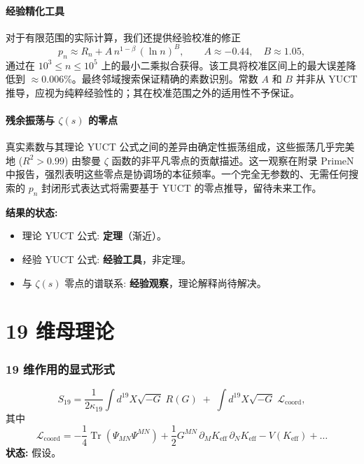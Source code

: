 \documentclass[11pt,a4paper]{article}
\DeclareMathOperator{\Tr}{Tr}
\begin{document}
	\subsection{经验精化工具}
	
	对于有限范围的实际计算，我们还提供经验校准的修正
	\[
	p_n \approx R_n + A\, n^{1-\beta}\,(\ln n)^B,
	\qquad A \approx -0.44,\quad B \approx 1.05,
	\]
	通过在 \(10^3\le n\le 10^5\) 上的最小二乘拟合获得。该工具将校准区间上的最大误差降低到 \(\approx 0.006\%\)。最终邻域搜索保证精确的素数识别。常数 \(A\) 和 \(B\) 并非从 YUCT 推导，应视为纯粹经验性的；其在校准范围之外的适用性不予保证。
	
	\subsection{残余振荡与 \(\zeta(s)\) 的零点}
	
	真实素数与其理论 YUCT 公式之间的差异由确定性振荡组成，这些振荡几乎完美地 (\(R^2>0.99\)) 由黎曼 \(\zeta\) 函数的非平凡零点的贡献描述。这一观察在附录 PrimeN 中报告，强烈表明这些零点是协调场的本征频率。一个完全无参数的、无需任何搜索的 \(p_n\) 封闭形式表达式将需要基于 YUCT 的零点推导，留待未来工作。
	
	\textbf{结果的状态:}
	\begin{itemize}
		\item 理论 YUCT 公式: \textbf{定理}（渐近）。
		\item 经验 YUCT 公式: \textbf{经验工具}，非定理。
		\item 与 \(\zeta(s)\) 零点的谱联系: \textbf{经验观察}，理论解释尚待解决。
	\end{itemize}
	
	\part{19 维母理论}
	
	\section{19 维作用的显式形式}
	\label{sec:19Dlagrangian}
	\[
	S_{19} = \frac{1}{2\kappa_{19}} \int d^{19}X \sqrt{-G}\; R(G) \;+\; \int d^{19}X \sqrt{-G}\; \mathcal{L}_{\text{coord}},
	\]
	其中
	\[
	\mathcal{L}_{\text{coord}} = -\frac{1}{4} \Tr(\Psi_{MN}\Psi^{MN}) + \frac{1}{2} G^{MN}\,\partial_M K_{\mathrm{eff}}\,\partial_N K_{\mathrm{eff}} - V(K_{\mathrm{eff}}) + \dots
	\]
	\textbf{状态:} 假设。
	
\end{document}
